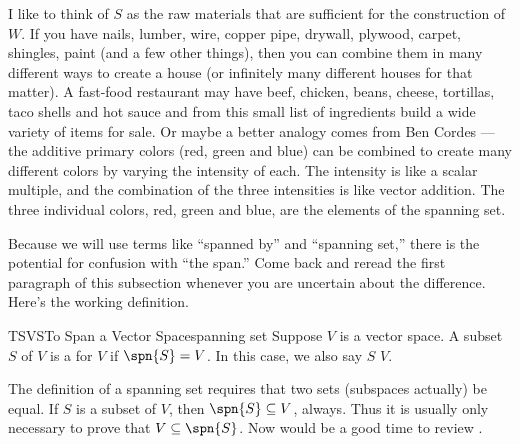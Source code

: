 %
I like to think of $S$ as the raw materials that are sufficient for the construction of $W$.  If you have nails, lumber, wire, copper pipe, drywall, plywood, carpet, shingles, paint (and a few other things), then you can combine them in many different ways to create a house (or infinitely many different houses for that matter).  A fast-food restaurant may have beef, chicken, beans, cheese, tortillas, taco shells and hot sauce and from this small list of ingredients build a wide variety of items for sale.  Or maybe a better analogy comes from Ben Cordes --- the additive primary colors (red, green and blue) can be combined to create many different colors by varying the intensity of each.  The intensity is like a scalar multiple, and the combination of the three intensities is like vector addition.  The three individual colors, red, green and blue, are the elements of the spanning set.\par
%
Because we will use terms like ``spanned by'' and ``spanning set,'' there is the potential for confusion with ``the span.''  Come back and reread the first paragraph of this subsection whenever you are uncertain about the difference.  Here's the working definition.\par
%
%
\begin{definition}{TSVS}{To Span a Vector Space}{spanning set}
Suppose $V$ is a vector space.  A subset $S$ of $V$ is a  for $V$ if $\spn{S}=V$.  In this case, we also say $S$  $V$.
\end{definition}
%
The definition of a spanning set requires that two sets (subspaces actually) be equal.  If $S$ is a subset of $V$, then $\spn{S}\subseteq V$, always.  Thus it is usually only necessary to prove that $V\subseteq\spn{S}$.  Now would be a good time to review .
%
